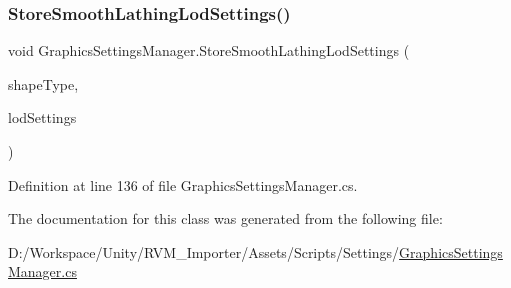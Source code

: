 \subsubsection{\texorpdfstring{StoreSmoothLathingLodSettings()}{StoreSmoothLathingLodSettings()}}
{\footnotesize\ttfamily void Graphics\+Settings\+Manager.\+Store\+Smooth\+Lathing\+Lod\+Settings (\begin{DoxyParamCaption}\item[{\mbox{\hyperlink{_shape_types_8cs_af0e24915ca1b4c216da56b86a5f3de13}{Shape\+Types}}}]{shape\+Type,  }\item[{List$<$ \mbox{\hyperlink{class_smooth_lathing_lod_settings}{Smooth\+Lathing\+Lod\+Settings}} $>$}]{lod\+Settings }\end{DoxyParamCaption})}



Definition at line 136 of file Graphics\+Settings\+Manager.\+cs.



The documentation for this class was generated from the following file\+:\begin{DoxyCompactItemize}
\item 
D\+:/\+Workspace/\+Unity/\+R\+V\+M\+\_\+\+Importer/\+Assets/\+Scripts/\+Settings/\mbox{\hyperlink{_graphics_settings_manager_8cs}{Graphics\+Settings\+Manager.\+cs}}\end{DoxyCompactItemize}
